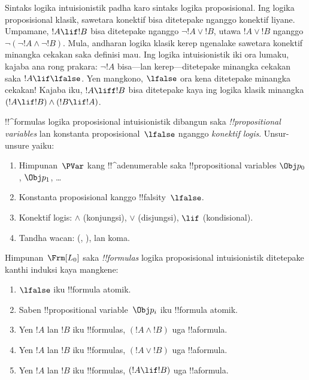 \documentclass[../../../include/open-logic-section]{subfiles}
\begin{document}


Sintaks logika intuisionistik padha karo sintaks logika proposisional.
Ing logika proposisional klasik, sawetara konektif bisa ditetepake
nganggo konektif liyane. Umpamane, $!A \lif !B$ bisa ditetepake
nganggo $\lnot !A \lor !B$, utawa $!A \lor !B$ nganggo
$\lnot(\lnot !A \land \lnot
!B)$. Mula, andharan logika klasik kerep ngenalake sawetara
konektif minangka cekakan saka definisi mau. Ing logika
intuisionistik iki ora lumaku, kajaba ana rong prakara: $\lnot !A$
bisa---lan kerep---ditetepake minangka cekakan saka $!A \lif \lfalse$.
Yen mangkono, $\lfalse$ ora kena ditetepake minangka cekakan!{} Kajaba
iku, $!A \liff !B$ bisa ditetepake kaya ing logika klasik minangka
$(!A \lif !B) \land (!B \lif
!A)$.

!!^{formula}s logika proposisional intuisionistik dibangun saka
\emph{!!{propositional variable}s} lan konstanta
proposisional~$\lfalse$ nganggo \emph{konektif logis}. Unsur-unsure yaiku:

\begin{enumerate}
\item Himpunan~$\PVar$ kang !!^a{denumerable} saka !!{propositional variable}s $\Obj p_0$,
  $\Obj p_1$, \dots
  \item Konstanta proposisional kanggo !!{falsity}~$\lfalse$.
\item Konektif logis: $\land$
  (konjungsi), $\lor$ (disjungsi), $\lif$ (kondisional).
\item Tandha wacan: (, ), lan koma.
\end{enumerate}

\begin{defn}[Rumus]
 Himpunan~$\Frm[L_0]$ saka \emph{!!{formula}s}
logika proposisional intuisionistik ditetepake kanthi induksi kaya mangkene:
\begin{enumerate}
\item $\lfalse$ iku !!{formula} atomik.

\item Saben !!{propositional variable}~$\Obj p_i$ iku !!{formula}
  atomik.

\item Yen $!A$ lan $!B$ iku !!{formula}s, $(!A \land
  !B)$ uga !!a{formula}.

\item Yen $!A$ lan $!B$ iku !!{formula}s, $(!A \lor !B)$
  uga !!a{formula}.

\item Yen $!A$ lan $!B$ iku !!{formula}s, $(!A \lif !B)$
  uga !!a{formula}.

\end{enumerate}
\end{defn}
\end{document}
